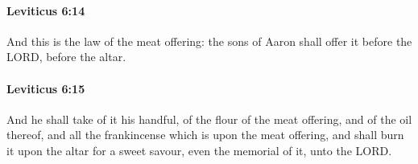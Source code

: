 		\paragraph{Leviticus 6:14} %
			\label{LEVITICUS-6-14}

			And this is the law of the meat offering: the sons of Aaron shall offer it before the LORD, before the altar.


		\paragraph{Leviticus 6:15} %
			\label{LEVITICUS-6-15}

			And he shall take of it his handful, of the flour of the meat offering, and of the oil thereof, and all the frankincense which is upon the meat offering, and shall burn it upon the altar for a sweet savour, even the memorial of it, unto the LORD.


